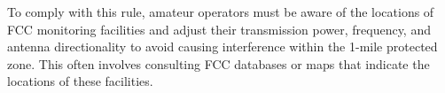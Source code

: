 To comply with this rule, amateur operators must be aware of the locations of FCC monitoring facilities and adjust their transmission power, frequency, and antenna directionality to avoid causing interference within the 1-mile protected zone. This often involves consulting FCC databases or maps that indicate the locations of these facilities.

